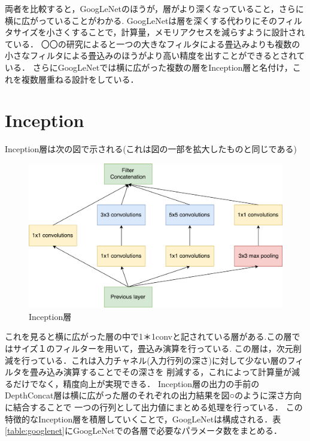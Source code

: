 {両者を比較すると，GoogLeNetのほうが，層がより深くなっていること，さらに横に広がっていることがわかる.
GoogLeNetは層を深くする代わりにそのフィルタサイズを小さくすることで，計算量，メモリアクセスを減らすように設計されている．
〇〇の研究によると一つの大きなフィルタによる畳込みよりも複数の小さなフィルタによる畳込みのほうがより高い精度を出すことができるとされている．
さらにGoogLeNetでは横に広がった複数の層をInception層と名付け，これを複数層重ねる設計をしている．

\section{Inception}
\label{sec:inception}
Inception層は次の図で示される(これは図の一部を拡大したものと同じである)

\begin{figure}[h]
  \centering
  \includegraphics[scale=0.5]{./chap2/fig/inception.pdf}
  \caption{Inception層}
  \label{fig:inception}
\end{figure}

これを見ると横に広がった層の中で1＊1convと記されている層がある.この層ではサイズ１のフィルターを用いて，畳込み演算を行っている.
この層は，次元削減を行っている．これは入力チャネル(入力行列の深さ)に対して少ない層のフィルタを畳み込み演算することでその深さを
削減する，これによって計算量が減るだけでなく，精度向上が実現できる．
Inception層の出力の手前のDepthConcat層は横に広がった層のそれぞれの出力結果を図○のように深さ方向に結合することで
一つの行列として出力値にまとめる処理を行っている．
この特徴的なInception層を積層していくことで，GoogLeNetは構成される．表\ref{table:googlenet}にGoogLeNetでの各層で必要なパラメータ数をまとめる．

}

